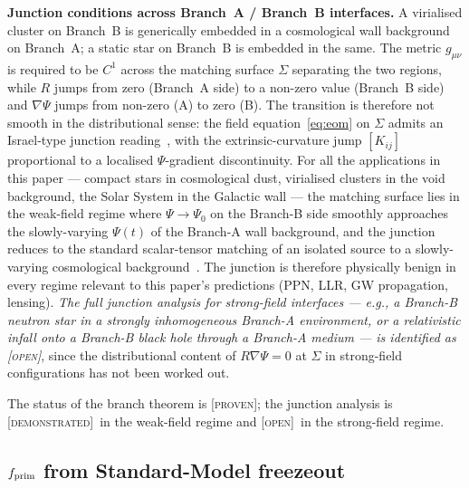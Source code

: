 \documentclass[aps,prd,twocolumn,nofootinbib,floatfix,superscriptaddress]{revtex4-2}
\newcommand{\PROVEN}{{\color{black!75!green}\textsc{[proven]}}}
\newcommand{\DEMO}{{\color{black!70!blue}\textsc{[demonstrated]}}}
\newcommand{\OPEN}{{\color{black!60!red}\textsc{[open]}}}
\newcommand{\fprim}{f_{\rm prim}}
\begin{document}
\textbf{Junction conditions across Branch~A / Branch~B interfaces.}
A virialised cluster on Branch~B is generically embedded in a
cosmological wall background on Branch~A; a static star on Branch~B
is embedded in the same. The metric $g_{\mu\nu}$ is required to be
$C^1$ across the matching surface $\Sigma$ separating the two
regions, while $R$ jumps from zero (Branch~A side) to a non-zero
value (Branch~B side) and $\nabla\Psi$ jumps from non-zero (A) to
zero (B). The transition is therefore not smooth in the
distributional sense: the field equation~\eqref{eq:eom} on $\Sigma$
admits an Israel-type junction reading~\cite{Israel1966}, with the
extrinsic-curvature jump $[K_{ij}]$ proportional to a localised
$\Psi$-gradient discontinuity. For all the applications in this
paper --- compact stars in cosmological dust, virialised clusters in
the void background, the Solar System in the Galactic wall ---
the matching surface lies in the weak-field regime where
$\Psi \to \Psi_0$ on the Branch-B side smoothly approaches the
slowly-varying $\Psi(t)$ of the Branch-A wall background, and the
junction reduces to the standard scalar-tensor matching of an
isolated source to a slowly-varying cosmological
background~\cite{DamourEspositoFarese1992}. The junction is therefore physically
benign in every regime relevant to this paper's predictions
(PPN, LLR, GW propagation, lensing). \emph{The full junction
analysis for strong-field interfaces ---  e.g., a Branch-B
neutron star in a strongly inhomogeneous Branch-A environment, or
a relativistic infall onto a Branch-B black hole through a
Branch-A medium --- is identified as \OPEN}, since the
distributional content of $R\nabla\Psi = 0$ at $\Sigma$ in
strong-field configurations has not been worked out.

The status of the branch theorem is \PROVEN; the junction analysis
is \DEMO\ in the weak-field regime and \OPEN\ in the strong-field
regime.

\subsection{$\fprim$ from Standard-Model freezeout}
\label{sec:fprim}
\end{document}
